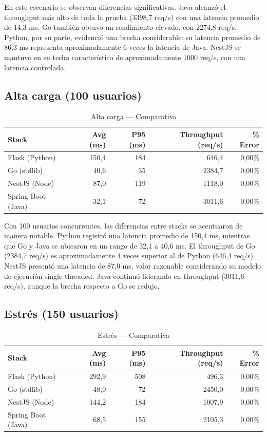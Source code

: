 \documentclass[12pt,a4paper]{article}
\begin{document}
En este escenario se observan diferencias significativas. Java alcanzó el throughput más alto de toda la prueba (3398,7 req/s) con una latencia promedio de 14,3 ms. Go también obtuvo un rendimiento elevado, con 2274,8 req/s. Python, por su parte, evidenció una brecha considerable: su latencia promedio de 86,3 ms representa aproximadamente 6 veces la latencia de Java. NestJS se mantuvo en su techo característico de aproximadamente 1000 req/s, con una latencia controlada.

\subsection{Alta carga (100 usuarios)}

\begin{table}[h]
\centering
\small
\begin{tabular}{lrrrr}
\toprule
\textbf{Stack} & \textbf{Avg (ms)} & \textbf{P95 (ms)} & \textbf{Throughput (req/s)} & \textbf{\% Error} \\
\midrule
Flask (Python)     & 150,4 & 184 & 646,4  & 0,00\% \\
Go (stdlib)        & 40,6  & 35  & 2384,7 & 0,00\% \\
NestJS (Node)      & 87,0  & 119 & 1118,0 & 0,00\% \\
Spring Boot (Java) & 32,1  & 72  & 3011,6 & 0,00\% \\
\bottomrule
\end{tabular}
\caption{Alta carga --- Comparativa}
\end{table}

Con 100 usuarios concurrentes, las diferencias entre stacks se acentuaron de manera notable. Python registró una latencia promedio de 150,4 ms, mientras que Go y Java se ubicaron en un rango de 32,1 a 40,6 ms. El throughput de Go (2384,7 req/s) es aproximadamente 4 veces superior al de Python (646,4 req/s). NestJS presentó una latencia de 87,0 ms, valor razonable considerando su modelo de ejecución single-threaded. Java continuó liderando en throughput (3011,6 req/s), aunque la brecha respecto a Go se redujo.

\subsection{Estrés (150 usuarios)}

\begin{table}[h]
\centering
\small
\begin{tabular}{lrrrr}
\toprule
\textbf{Stack} & \textbf{Avg (ms)} & \textbf{P95 (ms)} & \textbf{Throughput (req/s)} & \textbf{\% Error} \\
\midrule
Flask (Python)     & 292,9 & 508 & 496,3  & 0,00\% \\
Go (stdlib)        & 48,0  & 72  & 2450,0 & 0,00\% \\
NestJS (Node)      & 144,2 & 184 & 1007,9 & 0,00\% \\
Spring Boot (Java) & 68,5  & 155 & 2105,3 & 0,00\% \\
\bottomrule
\end{tabular}
\caption{Estrés --- Comparativa}
\end{table}
\end{document}
